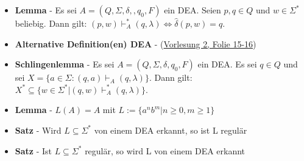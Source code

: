 \documentclass[12pt, a4paper]{article}
\begin{document}
\begin{itemize}
		\item \textbf{Lemma} - Es sei $A=(Q,\Sigma,\delta,,q_{0},F)$ ein DEA. Seien $p,q\in Q$ und $w\in\Sigma^{*}$ beliebig. Dann gilt: $(p,w)\vdash^{*}_{A}(q,\lambda)\Leftrightarrow\widehat{\delta}(p,w)=q$.
		
		\item \textbf{Alternative Definition(en) DEA} - (\href{https://studip.uni-trier.de/sendfile.php?type=0&file_id=83576c7d025a4dd2a914bf0f42ef01c6&file_name=VL2.pdf}{Vorlesung 2, Folie 15-16})
		
		\item \textbf{Schlingenlemma} - Es sei $A=(Q,\Sigma,\delta,q_{0},F)$ ein DEA. Es sei $q\in Q$ und sei $X=\{a\in\Sigma:(q,a)\vdash_{A}(q,\lambda)\}$. Dann gilt: $X^{*}\subseteq\{w\in\Sigma^{*}|(q,w)\vdash^{*}_{A}(q,\lambda)\}$.
		
		\item \textbf{Lemma} - $L(A)=A$ mit $L:=\{a^{n}b^{m}|n\geq0,m\geq1\}$
		
		\item \textbf{Satz} - Wird $L\subseteq\Sigma^{*}$ von einem DEA erkannt, so ist L regulär
		
		\item \textbf{Satz} - Ist $L\subseteq\Sigma^{*}$ regulär, so wird L von einem DEA erkannt
		
	\end{itemize}
\end{document}

